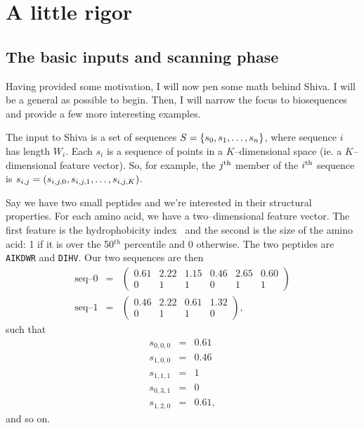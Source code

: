 \section{A little rigor}

    \subsection{The basic inputs and scanning phase}
	Having provided some motivation, I will now pen some math behind Shiva.  I will
	be a general as possible to begin.  Then, I will narrow the focus to biosequences
	and provide a few more interesting examples.

	The input to Shiva is a set of sequences $S=\left\{s_0,s_1,\ldots,s_n\right\}$, where sequence
	$i$ has length $W_i$.  Each $s_i$ is a sequence of points in a $K$--dimensional space (ie.
	a $K$--dimensional feature vector).  So, for example, the ${j^{\textrm{th}}}$ member of the 
	${i^{\textrm{th}}}$ sequence is $s_{i,j} = \left(s_{i,j,0}, s_{i,j,1}, \ldots,s_{i,j,K}\right)$.

	\begin{kljEx}
	    Say we have two small peptides and we're interested in their
	    structural properties.  For each amino acid, we have a two--dimensional
	    feature vector.  The first feature is the hydrophobicity index~\cite{argos1982structural}
	    and the second is the size of the amino acid: 1 if it is over the
	    50$^{th}$ percentile and 0 otherwise.  The two peptides are \texttt{AIKDWR}
	    and \texttt{DIHV}\@.  Our two sequences are then
		\begin{eqnarray*}
		    \text{seq--0} & = &	\begin{pmatrix}
					    0.61 & 2.22 & 1.15 & 0.46 & 2.65 & 0.60\\
					    0 & 1 & 1 & 0 & 1 & 1
					\end{pmatrix} \\
		    \text{seq--1} & = &	\begin{pmatrix}
					    0.46 & 2.22 & 0.61 & 1.32 \\
					    0 & 1 & 1 & 0
					\end{pmatrix},
		\end{eqnarray*}
	    such that
		\begin{eqnarray*}
		    s_{0,0,0} & = & 0.61 \\
		    s_{1,0,0} & = & 0.46 \\
		    s_{1,1,1} & = & 1 \\
		    s_{0,3,1} & = & 0 \\
		    s_{1,2,0} & = & 0.61,
		\end{eqnarray*}
	    and so on.
	\end{kljEx}

